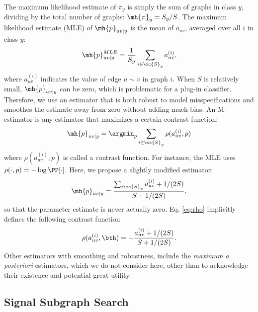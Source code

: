 The maximum likelihood estimate of $\pi_y$ is simply the sum of graphs in class $y$, dividing by the total number of graphs: $\mh{\pi}_y=S_y/S$. The maximum likelihood estimate (MLE) of $\mh{p}_{uv|y}$ is the mean of $a_{uv}$, averaged over all $i$ in class $y$:
\begin{align}
	\mh{p}_{uv|y}^{MLE} = \frac{1}{S_y} \sum_{i \in \mc{S}_y} a_{uv}^{(i)},
\end{align}
where  $a_{uv}^{(i)}$ indicates the value of edge $u\sim v$ in graph $i$.  When $S$ is relatively small, $\mh{p}_{uv|y}$ can be zero, which is problematic for a plug-in classifier.  Therefore, we use an estimator that is both robust to model misspecifications and smoothes the estimate away from zero without adding much bias.   An M-estimator is any estimator that maximizes a certain contrast function:
\begin{align}
	\mh{p}_{uv|y} = \argmin_{p} \sum_{i \in \mc{S}_y} \rho(a_{uv}^{(i)}, p)
\end{align}
 where $\rho(a_{uv}^{(i)},p)$ is called a contrast function. For instance, the MLE uses $\rho(\cdot, p)=-\log \PP[\cdot]$.  Here, we propose a slightly modified estimator:
\begin{align} \label{eq:rho}
	\mh{p}_{uv|y} = \frac{\sum_{i\mc{S}_y} a_{uv}^{(i)} + 1/(2S)}{S+1/(2S)},
\end{align}
so that the parameter estimate is never actually zero.   Eq. \eqref{eq:rho} implicitly defines the following contrast function
\begin{align}
\rho(a_{uv}^{(i)},\bth)=-\frac{a_{uv}^{(i)}+1/(2S)}{S+1/(2S)}.	
\end{align}
Other estimators with smoothing and robustness, include the \emph{maximum a posteriori} estimators, which we do not consider here, other than to acknowledge their existence and potential great utility.  






\subsection{Signal Subgraph Search} %
\label{sec:signal_subgraph_searches}


